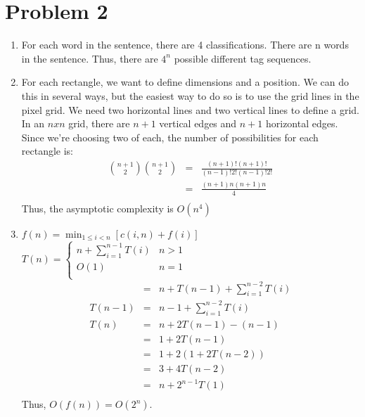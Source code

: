 \documentclass[12pt]{article}
\begin{document}
\section*{Problem 2}

\begin{enumerate}[label=(\alph*)]
  \item For each word in the sentence, there are 4 classifications. There are n words in the sentence. Thus, there are $4^n$ possible different tag sequences.
  
  \item For each rectangle, we want to define dimensions and a position. We can do this in several ways, but the easiest way to do so is to use the grid lines in the pixel grid. We need two horizontal lines and two vertical lines to define a grid. In an $n x n$ grid, there are $n + 1$ vertical edges and $n + 1$ horizontal edges. Since we're choosing two of each, the number of possibilities for each rectangle is:
  \begin{eqnarray*}
  \binom{n+1}{2}\binom{n+1}{2} &=& \frac{(n+1)!(n+1)!}{(n-1)!2!(n-1)!2!}\\
  &=& \frac{(n+1)n(n+1)n}{4}\\
  \end{eqnarray*}
  Thus, the asymptotic complexity is $O(n^4)$

  \item $f(n) = \min_{1 \le i < n} [c(i, n) + f(i)]$\\
  $T(n) = \left \{
     \begin{array}{lr}
       n + \displaystyle\sum\limits_{i=1}^{n-1} T(i) & n > 1\\
       O(1) & n = 1\\
     \end{array}
   \right.
   $
  \begin{eqnarray*}
  &=& n + T(n-1) + \displaystyle\sum\limits_{i=1}^{n-2} T(i)\\
  T(n-1) &=& n - 1 + \displaystyle\sum\limits_{i=1}^{n-2} T(i)\\
  T(n) &=& n + 2T(n-1) - (n-1)\\
  &=& 1 + 2T(n-1)\\
  &=& 1 + 2(1 + 2T(n-2))\\
  &=& 3 + 4T(n-2)\\
  &=& n + 2^{n-1} T(1)\\
  \end{eqnarray*}
  Thus, $O(f(n)) = O(2^n)$.
\end{enumerate}
\end{document}
